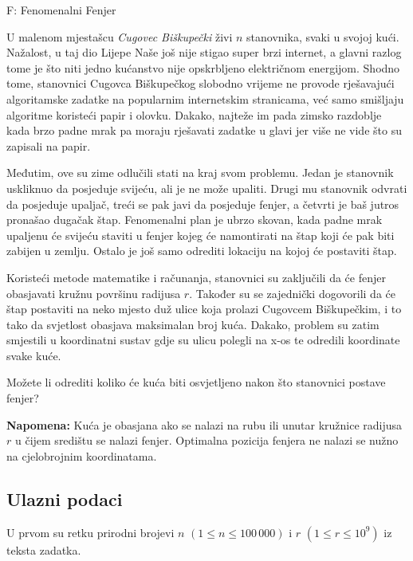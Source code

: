 \begin{statement}[
  timelimit=1 s,
  memorylimit=512 MiB,
]{F: Fenomenalni Fenjer}

U malenom mjestašcu \textit{Cugovec Biškupečki} živi $n$ stanovnika, svaki u
svojoj kući. Nažalost, u taj dio Lijepe Naše još nije stigao super brzi
internet, a glavni razlog tome je što niti jedno kućanstvo nije opskrbljeno
električnom energijom. Shodno tome, stanovnici Cugovca Biškupečkog slobodno
vrijeme ne provode rješavajući algoritamske zadatke na popularnim
internetskim stranicama, već samo smišljaju algoritme koristeći papir i
olovku. Dakako, najteže im pada zimsko razdoblje kada brzo padne mrak pa
moraju rješavati zadatke u glavi jer više ne vide što su zapisali na papir.

Međutim, ove su zime odlučili stati na kraj svom problemu. Jedan je stanovnik
uskliknuo da posjeduje svijeću, ali je ne može upaliti. Drugi mu stanovnik
odvrati da posjeduje upaljač, treći se pak javi da posjeduje fenjer, a
četvrti je baš jutros pronašao dugačak štap. Fenomenalni plan je ubrzo
skovan, kada padne mrak upaljenu će svijeću staviti u fenjer kojeg će
namontirati na štap koji će pak biti zabijen u zemlju. Ostalo je još samo
odrediti lokaciju na kojoj će postaviti štap.

Koristeći metode matematike i računanja, stanovnici su zaključili da će fenjer
obasjavati kružnu površinu radijusa $r$. Također su se zajednički dogovorili
da će štap postaviti na neko mjesto duž ulice koja prolazi Cugovcem
Biškupečkim, i to tako da svjetlost obasjava maksimalan broj kuća. Dakako,
problem su zatim smjestili u koordinatni sustav gdje su ulicu polegli na x-os
te odredili koordinate svake kuće.

Možete li odrediti koliko će kuća biti osvjetljeno nakon što stanovnici postave
fenjer?

\textbf{Napomena:} Kuća je obasjana ako se nalazi na rubu ili unutar kružnice
radijusa $r$ u čijem središtu se nalazi fenjer. Optimalna pozicija fenjera ne
nalazi se nužno na cjelobrojnim koordinatama.

\subsection*{Ulazni podaci}
U prvom su retku prirodni brojevi $n$ $(1 \le n \le 100\,000)$ i $r$
$(1 \le r \le 10^9)$ iz teksta zadatka.


\end{statement}
